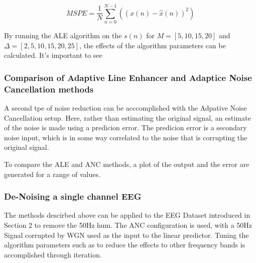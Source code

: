 \documentclass[main.tex]{subfiles}
\begin{document}
\begin{equation}
	MSPE = \frac{1}{N}\sum_{n=0}^{N-1}((x(n)-\hat{x}(n))^2)
\end{equation}

By running the ALE algorithm on the $s(n)$ for $M=[5,10,15,20]$ and $\Delta = [2,5,10,15,20,25]$, the effects of the algorithm parameters can be calculated. It's important to see %



\subsubsection{Comparison of Adaptive Line Enhancer and Adaptice Noise Cancellation methods}

A second tpe of noise reduction can be acccomplished with the Adpative Noise Cancellation setup. Here, rather than estimating the original signal, an estimate of the noise is made using a predicion error. The predicion error is a secondary noise input, which is in some way correlated to the noise that is corrupting the original signal.

To compare the ALE and ANC methods, a plot of the output and the error are generated for a range of values. %



\subsubsection{De-Noising a single channel EEG}

The methods descirbed above can be applied to the EEG Dataset introduced in Section 2 to remove the 50Hz hum. The ANC configuration is used, with a 50Hz Signal corrupted by WGN used as the input to the linear predictor. Tuning the algorithm parameters such as to reduce the effects to other frequency bands is accomplished through iteration.

\end{document}
